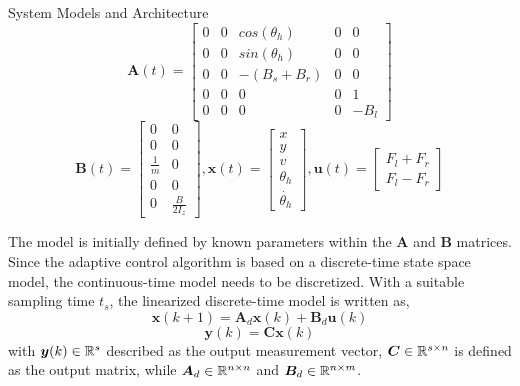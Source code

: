 \begin{section}{System Models and Architecture}
    \begin{equation}
	\bm{A}(t)=\begin{bmatrix} 0 & 0 & cos(\theta_h) & 0 & 0\\ 0 & 0 & sin(\theta_h) & 0 & 0 \\ 0 & 0 & -(B_s+B_r) & 0 & 0 \\ 0 & 0 & 0 & 0 & 1 \\ 0 & 0 & 0 & 0 & -B_l \end{bmatrix} \nonumber
	\end{equation}
	\begin{equation}
	\bm{B}(t)=\begin{bmatrix} 0 & 0 \\ 0 & 0 \\ \frac{1}{m} & 0 \\ 0 & 0 \\ 0 & \frac{B}{2I_z} \end{bmatrix}, 
     \bm{x}(t)=\begin{bmatrix} x \\ y \\ v \\ \theta_h \\ \dot{\theta_h} \end{bmatrix}, \bm{u}(t)= \begin{bmatrix} F_l+F_r \\ F_l-F_r  \end{bmatrix}  \nonumber
	\end{equation}

The model is initially defined by known parameters within the $\bm{A}$ and $\bm{B}$ matrices. Since the adaptive control algorithm is based on a discrete-time state space model, the continuous-time model needs to be discretized. With a suitable sampling time $t_s$, the linearized discrete-time model is written as,
    \begin{equation}
    \label{eq:discritzed_SS_model}
	\bm{x}(k+1) = \bm{A}_d\bm{x}(k) + \bm{B}_d\bm{u}(k)
	\end{equation}
	\begin{equation}
	\bm{y}(k)=\bm{C}\bm{x}(k)
	\end{equation}
with $\bm{y}(k) \in \mathbb{R}^{s}$ described as the output measurement vector, $\bm{C} \in \mathbb{R}^{s\times n}$ is defined as the output matrix, while $\bm{A}_d \in \mathbb{R}^{n\times n}$ and $\bm{B}_d \in \mathbb{R}^{n\times m}$.


\end{section}
